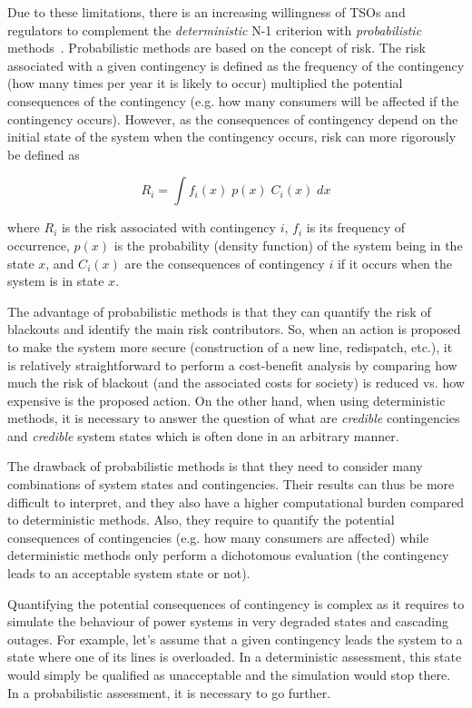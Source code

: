 Due to these limitations, there is an increasing willingness of TSOs and regulators to complement the \emph{deterministic} N-1 criterion with \emph{probabilistic} methods~\cite{ACER}. Probabilistic methods are based on the concept of risk. The risk associated with a given contingency is defined as the frequency of the contingency (how many times per year it is likely to occur) multiplied the potential consequences of the contingency (e.g. how many consumers will be affected if the contingency occurs). However, as the consequences of contingency depend on the initial state of the system when the contingency occurs, risk can more rigorously be defined as

\begin{equation}
    R_i = \int f_i(x) \; p(x) \; C_i(x) \; dx
\end{equation}

\noindent where \(R_i\) is the risk associated with contingency \(i\), \(f_i\) is its frequency of occurrence, \(p(x)\) is the probability (density function) of the system being in the state \(x\), and \(C_i(x)\) are the consequences of contingency \(i\) if it occurs when the system is in state \(x\).

The advantage of probabilistic methods is that they can quantify the risk of blackouts and identify the main risk contributors. So, when an action is proposed to make the system more secure (construction of a new line, redispatch, etc.), it is relatively straightforward to perform a cost-benefit analysis by comparing how much the risk of blackout (and the associated costs for society) is reduced vs. how expensive is the proposed action. On the other hand, when using deterministic methods, it is necessary to answer the question of what are \emph{credible} contingencies and \emph{credible} system states which is often done in an arbitrary manner.

The drawback of probabilistic methods is that they need to consider many combinations of system states and contingencies. Their results can thus be more difficult to interpret, and they also have a higher computational burden compared to deterministic methods. Also, they require to quantify the potential consequences of contingencies (e.g. how many consumers are affected) while deterministic methods only perform a dichotomous evaluation (the contingency leads to an acceptable system state or not).

Quantifying the potential consequences of contingency is complex as it requires to simulate the behaviour of power systems in very degraded states and cascading outages. For example, let's assume that a given contingency leads the system to a state where one of its lines is overloaded. In a deterministic assessment, this state would simply be qualified as unacceptable and the simulation would stop there. In a probabilistic assessment, it is necessary to go further.

